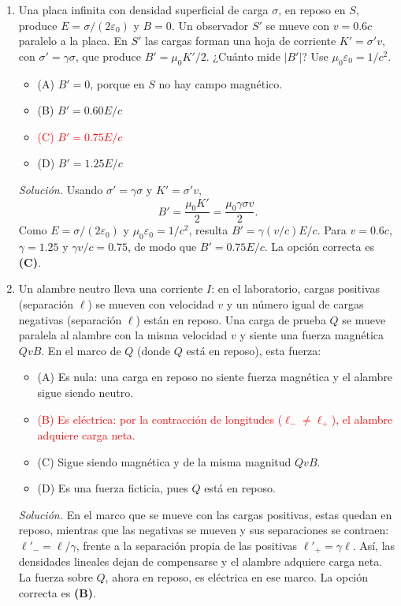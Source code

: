 \documentclass[11pt]{article}
\begin{document}
\begin{enumerate}
    \item Una placa infinita con densidad superficial de carga $\sigma$, en reposo en $S$, produce $E=\sigma/(2\varepsilon_0)$ y $B=0$. Un observador $S'$ se mueve con $v=0.6c$ paralelo a la placa. En $S'$ las cargas forman una hoja de corriente $K'=\sigma'v$, con $\sigma'=\gamma\sigma$, que produce $B'=\mu_0K'/2$. ¿Cuánto mide $|B'|$? Use $\mu_0\varepsilon_0=1/c^2$.
    \begin{itemize}
        \item (A) $B'=0$, porque en $S$ no hay campo magnético.
        \item (B) $B'=0.60E/c$
        \item \textcolor{red}{(C) $B'=0.75E/c$}
        \item (D) $B'=1.25E/c$
    \end{itemize}
    \textit{Solución.} Usando $\sigma'=\gamma\sigma$ y $K'=\sigma'v$,
    \[
        B'=\frac{\mu_0K'}{2}=\frac{\mu_0\gamma\sigma v}{2}.
    \]
    Como $E=\sigma/(2\varepsilon_0)$ y $\mu_0\varepsilon_0=1/c^2$, resulta $B'=\gamma(v/c)E/c$. Para $v=0.6c$, $\gamma=1.25$ y $\gamma v/c=0.75$, de modo que $B'=0.75E/c$. La opción correcta es \textbf{(C)}. \parencite{chaparro2026}

    \item Un alambre neutro lleva una corriente $I$: en el laboratorio, cargas positivas (separación $\ell$) se mueven con velocidad $v$ y un número igual de cargas negativas (separación $\ell$) están en reposo. Una carga de prueba $Q$ se mueve paralela al alambre con la misma velocidad $v$ y siente una fuerza magnética $QvB$. En el marco de $Q$ (donde $Q$ está en reposo), esta fuerza:
    \begin{itemize}
        \item (A) Es nula: una carga en reposo no siente fuerza magnética y el alambre sigue siendo neutro.
        \item \textcolor{red}{(B) Es eléctrica: por la contracción de longitudes ($\ell_-\ne\ell_+$), el alambre adquiere carga neta.}
        \item (C) Sigue siendo magnética y de la misma magnitud $QvB$.
        \item (D) Es una fuerza ficticia, pues $Q$ está en reposo.
    \end{itemize}
    \textit{Solución.} En el marco que se mueve con las cargas positivas, estas quedan en reposo, mientras que las negativas se mueven y sus separaciones se contraen: $\ell'_- =\ell/\gamma$, frente a la separación propia de las positivas $\ell'_+=\gamma\ell$. Así, las densidades lineales dejan de compensarse y el alambre adquiere carga neta. La fuerza sobre $Q$, ahora en reposo, es eléctrica en ese marco. La opción correcta es \textbf{(B)}. \parencite{chaparro2026}


\end{enumerate}
\end{document}

